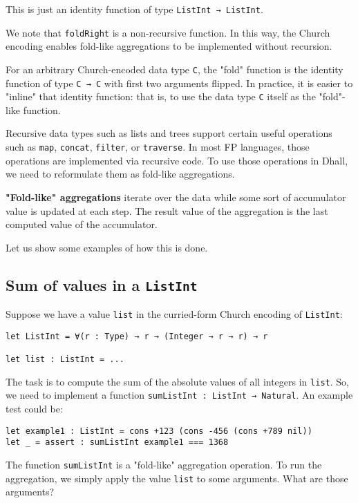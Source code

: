 This is just an identity function of type \lstinline!ListInt → ListInt!.


We note that \lstinline!foldRight! is a non-recursive function.
In this way, the Church encoding enables fold-like aggregations to be implemented without recursion.


For an arbitrary Church-encoded data type \lstinline!C!, the "fold" function is the identity function of type \lstinline!C → C! with first two arguments flipped.
In practice, it is easier to "inline" that identity function: that is, to use the data type \lstinline!C! itself as the "fold"-like function.


Recursive data types such as lists and trees support certain useful operations such as \lstinline!map!, \lstinline!concat!, \lstinline!filter!, or \lstinline!traverse!.
In most FP languages, those operations are implemented via recursive code.
To use those operations in Dhall, we need to reformulate them as fold-like aggregations.


\textbf{"Fold-like" aggregations} iterate over the data while some sort of accumulator value is updated at each step.
The result value of the aggregation is the last computed value of the accumulator.


Let us show some examples of how this is done.


\subsection{Sum of values in a \lstinline!ListInt!}


Suppose we have a value \lstinline!list! in the curried-form Church encoding of \lstinline!ListInt!:


\begin{lstlisting}[language=Dhall]
let ListInt = ∀(r : Type) → r → (Integer → r → r) → r

let list : ListInt = ...
\end{lstlisting}


The task is to compute the sum of the absolute values of all integers in \lstinline!list!.
So, we need to implement a function \lstinline!sumListInt : ListInt → Natural!.
An example test could be:


\begin{lstlisting}[language=Dhall]
let example1 : ListInt = cons +123 (cons -456 (cons +789 nil))
let _ = assert : sumListInt example1 === 1368
\end{lstlisting}


The function \lstinline!sumListInt! is a "fold-like" aggregation operation.
To run the aggregation, we simply apply the value \lstinline!list! to some arguments.
What are those arguments?


